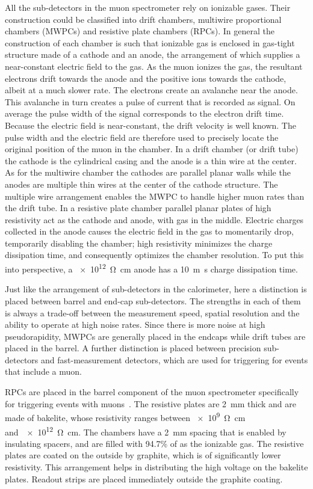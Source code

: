 \par All the sub-detectors in the muon spectrometer rely on ionizable gases. Their construction could be classified into 
drift chambers, multiwire proportional chambers (MWPCs) and resistive plate chambers (RPCs). In general the construction of each 
chamber is such that ionizable gas is enclosed in gas-tight structure made of a cathode and an 
anode, the arrangement of which supplies a near-constant electric field to the gas. As the muon  
ionizes the gas, the resultant electrons drift towards the anode and the positive ions towards 
the cathode, albeit at a much slower rate. The electrons create an avalanche near the anode. This avalanche in turn 
creates a pulse of current that is recorded as signal. On average the pulse width of the signal corresponds 
to the electron drift time. Because the electric field is near-constant, the drift velocity is well known. 
The pulse width and the electric field are therefore used to precisely locate the original position 
of the muon in the chamber. In a drift chamber (or drift tube) the cathode is the cylindrical  
casing and the anode is a thin wire at the center. As for the multiwire chamber the cathodes are parallel
planar walls while the anodes are multiple thin wires at the center of the cathode structure. 
The multiple wire arrangement enables the MWPC to handle higher muon rates than the 
drift tube. In a resistive plate chamber parallel planar plates of high resistivity act as the cathode 
and anode, with gas in the middle. Electric charges collected in the anode causes the electric field in the 
gas to momentarily drop, temporarily disabling the chamber; high resistivity minimizes the charge dissipation 
time, and consequently optimizes the chamber resolution. To put this into perspective, a \SI{e12}{\ohm\cm} anode 
has a \SI{10}{\m\s} charge dissipation time. 

\par Just like the arrangement of sub-detectors in the calorimeter, here a distinction is placed between 
barrel and end-cap sub-detectors. The strengths in each of them is always a trade-off between the measurement 
speed, spatial resolution and the ability to operate at high noise rates. Since there is more noise at high 
pseudorapidity, MWPCs are generally placed in the endcaps while drift tubes are placed in the barrel. A further
distinction is placed between precision sub-detectors and fast-measurement detectors, which are used 
for triggering for events that include a muon. 

\par RPCs are placed in the barrel component of the muon spectrometer specifically 
for triggering events with muons~\cite{1742-6596-280-1-012001}. The resistive plates are \SI{2}{\mm} thick and are made of bakelite, 
whose resistivity ranges between \SI{e9}{\ohm\cm} and~\SI{e12}{\ohm\cm}. The chambers have a \SI{2}{\mm} spacing that is enabled 
by insulating spacers, and are filled with 94.7\% of  as the ionizable gas.
The resistive plates are coated on the outside by graphite, which is of significantly 
lower resistivity. This arrangement helps in distributing the high voltage on the bakelite plates. Readout 
strips are placed immediately outside the graphite coating.   

